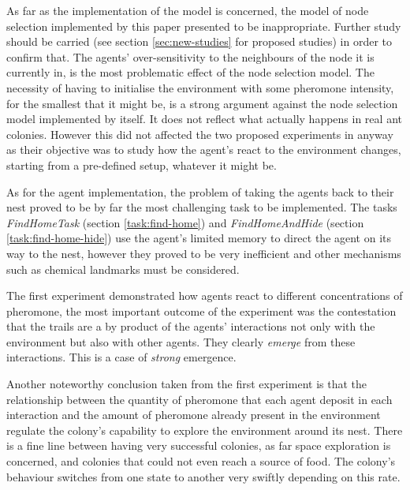 As far as the implementation of the model is concerned, the model of node selection implemented by this paper presented to be inappropriate. Further study should be carried (see section \ref{sec:new-studies} for proposed studies) in order to confirm that. The agents' over-sensitivity to the neighbours of the node it is currently in, is the most problematic effect of the node selection model. The necessity of having to initialise the environment with some pheromone intensity, for the smallest that it might be, is a strong argument against the node selection model implemented by itself. It does not reflect what actually happens in real ant colonies. However this did not affected the two proposed experiments in anyway as their objective was to study how the agent's react to the environment changes, starting from a pre-defined setup, whatever it might be.

As for the agent implementation, the problem of taking the agents back to their nest proved to be by far the most challenging task to be implemented. The tasks \emph{FindHomeTask} (section \ref{task:find-home}) and \emph{FindHomeAndHide} (section \ref{task:find-home-hide}) use the agent's limited memory to direct the  agent on its way to the nest, however they proved to be very inefficient and other mechanisms such as chemical landmarks must be considered.

The first experiment demonstrated how agents react to different concentrations of pheromone, the most important outcome of the experiment was the contestation that the trails are a by product of the agents' interactions not only with the environment but also with other agents. They clearly \emph{emerge} from these interactions. This is a case of \emph{strong} emergence. 

Another noteworthy conclusion taken from the first experiment is that the relationship between the quantity of pheromone that each agent deposit in each interaction and the amount of pheromone already present in the environment regulate the colony's capability to explore the environment around its nest. There is a fine line between having very successful colonies, as far space exploration is concerned, and colonies that could not even reach a source of food. The colony's behaviour switches from one state to another very swiftly depending on this rate.

